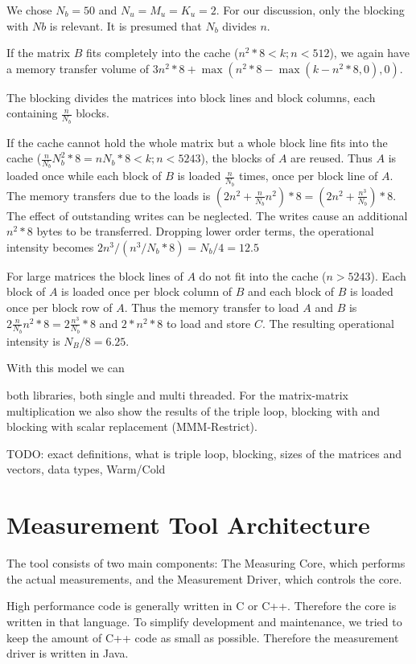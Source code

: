 \documentclass[a4paper,12pt]{article}
\begin{document}
We chose $N_b=50$ and $N_u=M_u=K_u=2$.
For our discussion, only the blocking with $Nb$ is relevant. It is presumed that
$N_b$ divides $n$. 

If the matrix $B$ fits completely into the cache ($n^2*8<k;n<512$), we again
have a memory transfer volume of $3n^2*8+\max(n^2*8-\max(k-n^2*8,0),0)$. 

The blocking divides the matrices into block lines and block columns, each
containing $\frac{n}{N_b}$ blocks.

If the cache cannot hold the whole matrix but a whole block line fits into the
cache ($\frac{n}{N_b}N_b^2*8=nN_b*8<k;n<5243$), the blocks of $A$ are reused.
Thus $A$ is loaded once while each block of $B$ is loaded $\frac{n}{N_b}$ times,
once per block line of $A$. The memory transfers due to the loads is
$(2n^2+\frac{n}{N_b}n^2)*8=(2n^2+\frac{n^3}{N_b})*8$. The effect of outstanding
writes can be neglected. The writes cause an additional $n^2*8$ bytes to be
transferred. Dropping lower order terms, the operational intensity becomes
$2n^3/(n^3/N_b*8)=N_b/4=12.5$

For large matrices the block lines of $A$ do not fit into the cache ($n>5243$).
Each block of $A$ is loaded once per block column of $B$ and each block of $B$ is loaded
once per block row of $A$. Thus the memory transfer to load $A$ and $B$ is
$2\frac{n}{N_b}n^2*8=2\frac{n^3}{N_b}*8$ and $2*n^2*8$ to load and store $C$.
The resulting operational intensity is $N_B/8=6.25$.

With this model we can 

both libraries, both single and multi threaded. For the matrix-matrix
multiplication we also show the results of the triple loop, blocking with
 and blocking with scalar replacement (MMM-Restrict).

TODO: exact definitions, what is triple loop, blocking, sizes of the matrices
and vectors, data types, Warm/Cold




\clearpage
\section{Measurement Tool Architecture}
The tool consists of two main components: The Measuring Core, which performs the
actual measurements, and the Measurement Driver, which controls the core.

High performance code is generally written in C or C++. Therefore the core is
written in that language. To simplify development and maintenance, we tried to
keep the amount of C++ code as small as possible. Therefore the measurement
driver is written in Java.
\end{document}

